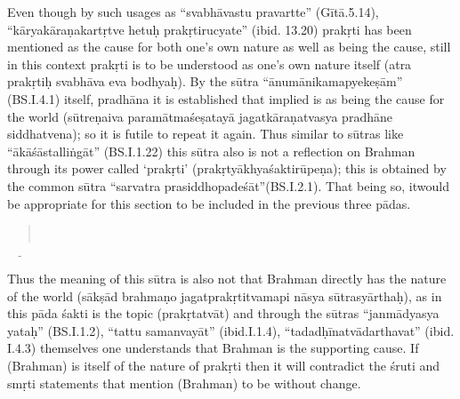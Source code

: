 Even though by such usages as “svabhāvastu pravartte” (Gītā.5.14), “kāryakāraṇakartṛtve hetuḥ prakṛtirucyate” (ibid. 13.20) prakṛti has been mentioned as the cause for both one’s own nature as well as being the cause, still in this context prakṛti is to be understood as  one’s own nature itself (atra prakṛtiḥ svabhāva eva bodhyaḥ). By the sūtra “ānumā\-nikamapyekeṣām” (BS.I.4.1) itself, pradhāna it is established that implied is as being the cause for the world (sūtreṇaiva paramātmaśeṣatayā jagatkāraṇatvasya pradhāne siddhatvena); so it is futile to repeat it again.  Thus similar to sūtras like “ākāśāstalliṅgāt” (BS.I.1.22) this sūtra also is not a reflection on Brahman through its power called ‘prakṛti’ (prakṛtyākhyaśaktirūpeṇa); this is obtained by the common sūtra “sarvatra prasiddhopadeśāt”(BS.I.2.1). That being so, it\break would be appropriate for this section to be included in the previous three pādas.



\begin{verse}
\\
\end{verse}


 $\underline{\qquad}$

Thus the meaning of this sūtra is also not that Brahman directly has the nature of the world (sākṣād brahmaṇo jagatprakṛtitvamapi nāsya sūtrasyārthaḥ), as in this pāda śakti is the topic (prakṛtatvāt) and through the sūtras “janmādyasya yataḥ” (BS.I.1.2), “tattu samanvayāt” (ibid.I.1.4), “tadadḥīnatvādarthavat” (ibid. I.4.3) themselves one understands that Brahman is the supporting cause. If (Brahman) is itself of the nature of prakṛti then it will contradict the śruti and smṛti statements that mention (Brahman) to be without change.

